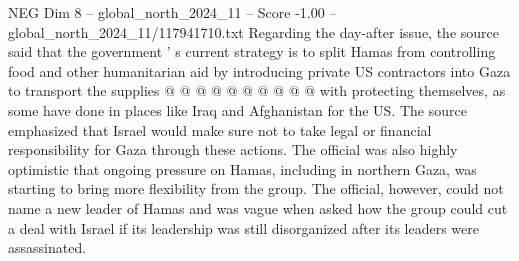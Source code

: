 \begin{textsample}{NEG Dim 8 – global\_north\_2024\_11 – Score -1.00 – global\_north\_2024\_11/117941710.txt}
Regarding the day-after issue, the source said that the government ' s current strategy is to split Hamas from controlling food and other humanitarian aid by introducing private US contractors into Gaza to transport the supplies @ @ @ @ @ @ @ @ @ @ with protecting themselves, as some have done in places like Iraq and Afghanistan for the US.
The source emphasized that Israel would make sure not to take legal or financial responsibility for Gaza through these actions.
The official was also highly optimistic that ongoing pressure on Hamas, including in northern Gaza, was starting to bring more flexibility from the group.
The official, however, could not name a new leader of Hamas and was vague when asked how the group could cut a deal with Israel if its leadership was still disorganized after its leaders were assassinated.

\end{textsample}
